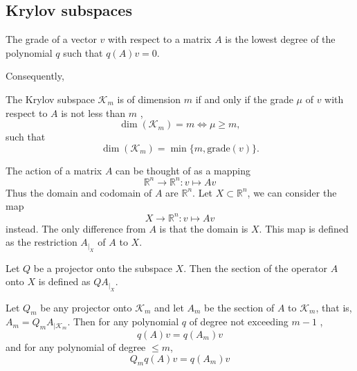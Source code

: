 \subsection{Krylov subspaces}
\begin{definition}
  The grade of a vector $v$ with respect to a matrix $A$ is the lowest degree of the polynomial $q$ such that $q(A)v = 0$.
  \label{def:cg_grade}
\end{definition}
Consequently,
\begin{theorem}
  The Krylov subspace $\mathcal{K}_m$ is of dimension $m$ if and only if the grade $\mu$ of $v$ with respect to $A$ is not less than $m$ \cite[proposition 6.2]{iter_method_saad},
  \begin{equation*}
    \dim(\mathcal{K}_m) = m \iff \mu \geq m,
  \end{equation*}
  such that
  \begin{equation}
    \dim(\mathcal{K}_m) = \min \{m, \textrm{grade}(v)\}.
    \label{eq:cg_krylov_dimension}
  \end{equation}
  \label{th:cg_krylov_dimension}
\end{theorem}

\begin{definition}
  The action of a matrix $A$ can be thought of as a mapping
  \begin{equation*}
    \mathbb{R}^n \rightarrow \mathbb{R}^n: v \mapsto A v
  \end{equation*}
  Thus the domain and codomain of $A$ are $\mathbb{R}^n$. Let $X \subset \mathbb{R}^n$, we can consider the map
  \begin{equation*}
    X \rightarrow \mathbb{R}^n: v \mapsto A v
  \end{equation*}
  instead. The only difference from $A$ is that the domain is $X$. This map is defined as the restriction $A_{\left.\right|_X}$ of $A$ to $X$.
\end{definition}

\begin{definition}
  Let $Q$ be a projector onto the subspace $X$. Then the section of the operator $A$ onto $X$ is defined as $QA_{\left.\right|_X}$.
\end{definition}

\begin{theorem}
  Let $Q_m$ be any projector onto $\mathcal{K}_m$ and let $A_m$ be the section of $A$ to $\mathcal{K}_m$, that is, $A_m=Q_m A_{\left.\right|\mathcal{K}_m}$. Then for any polynomial $q$ of degree not exceeding $m-1$ \cite[proposition 6.3]{iter_method_saad},
  \begin{equation*}
    q(A) v=q\left(A_m\right) v
  \end{equation*}
  and for any polynomial of degree $\leq m$,
  \begin{equation*}
    Q_m q(A) v=q\left(A_m\right) v
  \end{equation*}
\end{theorem}

